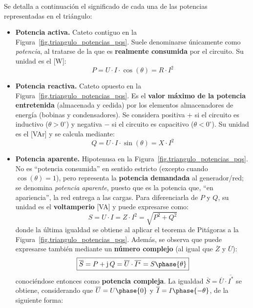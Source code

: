 \documentclass[11pt]{book} %
\begin{document}
	Se detalla a continuación el significado de cada una de las potencias representadas en el triángulo: 
	\begin{itemize}
		\item \textbf{Potencia activa.} Cateto contiguo en la Figura~\ref{fig.triangulo_potencias_pqs}. Suele denominarse únicamente como \textit{potencia}, al tratarse de la que es \textbf{realmente consumida} por el circuito. Su unidad es el [W]:
		\begin{equation}\label{eq.Pactiva}
			\boxed{P = U\cdot I\cdot\cos(\theta) = R \cdot I^2}
		\end{equation}
		\item \textbf{Potencia reactiva.} Cateto opuesto en la Figura~\ref{fig.triangulo_potencias_pqs}. Es el \textbf{valor máximo de la potencia entretenida} (almacenada y cedida) por los elementos almacenadores de energía (bobinas y condensadores). Se considera positiva $+$ si el circuito es inductivo ($\theta>0^\circ$) y negativa $-$ si el circuito es capacitivo ($\theta<0^\circ$). Su unidad es el [VAr] y se calcula mediante: 
		\begin{equation}\label{eq.Qreactiva}
			\boxed{Q = U\cdot I\cdot\sin(\theta) = X \cdot I^2}
		\end{equation}
		\item \textbf{Potencia aparente.} Hipotenusa en la Figura~\ref{fig.triangulo_potencias_pqs}. No es ``potencia consumida'' en sentido estricto (excepto cuando $\cos(\theta)=1$), pero representa la \textbf{potencia demandada} al generador/red; se denomina \textit{potencia aparente}, puesto que es la potencia que, ``en apariencia'', la red entrega a las cargas. Para diferenciarla de $P$ y $Q$, su unidad es el \textbf{voltamperio} [VA] y puede expresarse como: 
		\begin{equation}\label{eq.Saparente}
			\boxed{S = U\cdot I= Z \cdot I^2=\sqrt{P^2+Q^2}}
		\end{equation}
		donde la última igualdad se obtiene al aplicar el teorema de Pitágoras a la Figura~\ref{fig.triangulo_potencias_pqs}. Además, se observa que puede expresarse también mediante un \textbf{número complejo} (al igual que $\overline{Z}$ y $\overline{U}$): 
		\begin{equation}
			\boxed{\overline{S}=P+\mathrm{j}\,Q=\overline{U}\cdot \overline{I^*}=S\phase{\theta}}
		\end{equation}
		conociéndose entonces como \textbf{potencia compleja}. La igualdad $\overline{S}=\overline{U}\cdot \overline{I^*}$ se obtiene, considerando que $\overline{U} = U\phase{0}$ y $\overline{I} = I\phase{-\theta}$, de la siguiente forma: 

\end{itemize}
\end{document}
